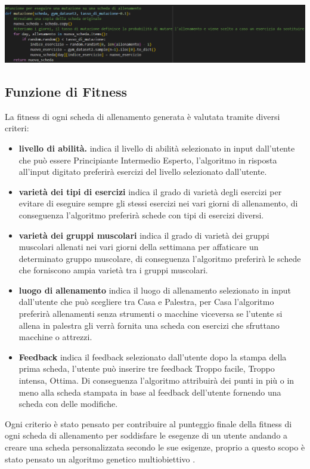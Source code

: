 \documentclass{book}
\begin{document}
  \includegraphics[width=1.0\linewidth]{Mutazione.png} 


  \subsection{Funzione di Fitness}
  La fitness di ogni scheda di allenamento generata è valutata tramite diversi criteri:
  \begin{itemize}
      \item \textbf{livello di abilità.}
            indica il livello di abilità selezionato in input dall'utente che può essere Principiante Intermedio Esperto, l'algoritmo in risposta all'input digitato preferirà esercizi del livello selezionato dall'utente.
      \item \textbf{varietà dei tipi di esercizi}
            indica il grado di varietà degli esercizi per evitare di eseguire sempre gli stessi esercizi nei vari giorni di allenamento,  di conseguenza l'algoritmo preferirà schede con tipi di esercizi diversi.
      \item \textbf{varietà dei gruppi muscolari}
            indica il grado di varietà dei gruppi muscolari allenati nei vari giorni della settimana per affaticare un determinato gruppo muscolare, di conseguenza l'algoritmo preferirà le schede che forniscono ampia varietà tra i gruppi muscolari.
      \item \textbf{luogo di allenamento}
            indica il luogo di allenamento selezionato in input dall'utente che può scegliere tra Casa e Palestra, per Casa l'algoritmo preferirà allenamenti senza strumenti o macchine viceversa se l'utente si allena in palestra gli verrà fornita una scheda con esercizi che sfruttano macchine o attrezzi.
      \item \textbf{Feedback}
            indica il feedback selezionato dall'utente dopo la stampa della prima scheda, l'utente può inserire tre feedback Troppo facile, Troppo intensa, Ottima. Di conseguenza l'algoritmo attribuirà dei punti in più o in meno alla scheda stampata in base al feedback dell'utente fornendo una scheda con delle modifiche.
  \end{itemize}
  Ogni criterio è stato pensato per contribuire al punteggio finale della fitness di ogni scheda di allenamento per soddisfare le esegenze di un utente andando a creare una scheda personalizzata secondo le sue esigenze, proprio a questo scopo è stato pensato un algoritmo genetico multiobiettivo .\newline
\end{document}
